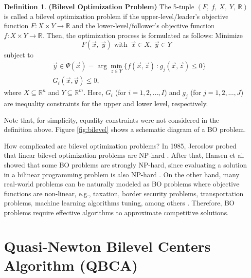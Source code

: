 \documentclass[conference]{IEEEtran}
\theoremstyle{definition}
\newtheorem{definition}{Definition}[section]
\begin{document}
\begin{definition}\textbf{(Bilevel Optimization Problem)}
    The 5-tuple $(F, \ f, \ X, \ Y, \ \mathbb{R} )$ is called a bilevel optimization
    problem if the upper-level/leader's objective function
    $F: X \times Y \to \mathbb{R}$ and the lower-level/follower's objective
    function $f: X \times Y \to \mathbb{R}$. Then, the optimization process is
    formulated as follows:
    \noindent
    Minimize
    \begin{equation}
        F(\vec{x},\ \vec{y}) \text{ with } \ \vec{x} \in X , \ \vec{y} \in Y 
        \label{eqn:minF1}
    \end{equation}
    subject to
    \begin{align}
        \label{eqn:y-arg}
        &\vec{y} \in \Psi(\vec{x}) = \arg \min_{z\in Y} \{ f(\vec{x}, \vec{z}) \ : g_j(\vec{x}, \vec{z})  \leq 0 \} \\
        &  G_{i}(\vec{x}, \vec{y}) \leq 0,
    \end{align}
    where $X \subseteq \mathbb{R}^n $
    and $Y \subseteq \mathbb{R}^m$.
    Here, $G_i$ (for $i = 1,2,\ldots,I$) and $g_j$ (for $j = 1,2,\ldots,J$) are
    inequality constraints for the upper and lower level, respectively.
\end{definition}
% 
Note that, for simplicity, equality constraints were not considered in the definition
above. Figure \ref{fig:bilevel} shows a schematic diagram of a BO problem.
% 

How complicated are bilevel optimization problems?  In 1985, Jeroslow probed that
linear bilevel optimization problems are NP-hard \cite{jeroslow1985polynomial}.
After that, Hansen et al. showed that some BO problems are strongly NP-hard, since
evaluating a solution in a bilinear programming problem is also NP-hard
\cite{hansen1992new,vicente1994descent}. On the other hand, many real-world problems can
be naturally modeled as BO problems \cite{sinha2018review} where objective functions
are non-linear, e.g., taxation, border security problems, transportation problems,
machine learning algorithms tuning, among others \cite{bard2013practical,sinha2018review,arroyo2010bilevel}.
Therefore, BO problems require effective algorithms to approximate competitive
solutions.



\section{Quasi-Newton Bilevel Centers Algorithm (QBCA)} %
\label{sec:qca}
\end{document}
